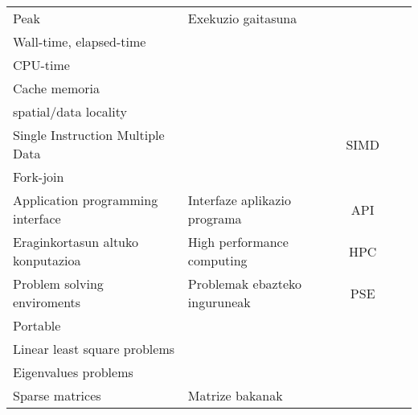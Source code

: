 \begin{table}
\begin{tabular}{ l l c c c }
 Peak                                    &  Exekuzio gaitasuna                   &             &                  \\
 Wall-time, elapsed-time                 &                                       &             &                  \\
 CPU-time                                &                                       &             &                  \\
 Cache memoria                           &                                       &             &                  \\ 
 spatial/data locality                   &                                       &             &                  \\
 Single Instruction Multiple Data        &                                       & SIMD        &                  \\
 Fork-join                               &                                       &             &                  \\
 Application programming interface       & Interfaze aplikazio programa          & API         &                  \\
 Eraginkortasun altuko konputazioa       & High performance computing            & HPC         &                  \\
 Problem solving enviroments             & Problemak ebazteko inguruneak         & PSE         &                  \\
 Portable                                &                                       &             &                  \\
 Linear least square problems            &                                       &             &                  \\
 Eigenvalues problems                    &                                       &             &                  \\
 Sparse matrices                         & Matrize bakanak                       &             &                  \\
                                                            
 
                                
 \hline
 \end{tabular}
\end{table}
